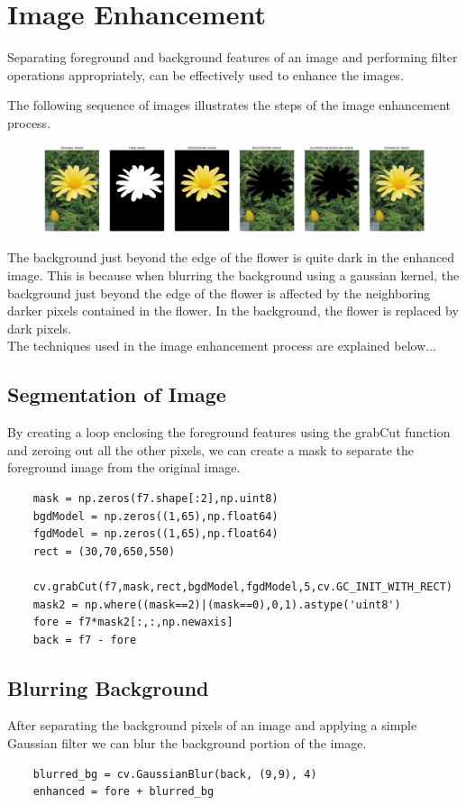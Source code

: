\documentclass[12pt,a4paper]{article}
\begin{document}
\section{Image Enhancement}
Separating foreground and background features of an image and performing filter operations appropriately, can be effectively used to enhance the images.
\par
The following sequence of images illustrates the steps of the image enhancement process. 
\par
\begin{figure}[h]
    \includegraphics[width=\textwidth]{q7.png}
    \centering
\end{figure}
The background just beyond the edge of the flower is quite dark in the enhanced image. This is because when blurring the background using a gaussian kernel, the background just beyond the edge of the flower is affected by the neighboring darker pixels contained in the flower.
In the background, the flower is replaced by dark pixels.
\\
The techniques used in the image enhancement process are explained below...
\newpage
\subsection{Segmentation of Image}
By creating a loop enclosing the foreground features using the grabCut function and zeroing out all the other pixels, we can create a mask to separate the foreground image from the original image.
\begin{lstlisting}
    mask = np.zeros(f7.shape[:2],np.uint8)
    bgdModel = np.zeros((1,65),np.float64)
    fgdModel = np.zeros((1,65),np.float64)
    rect = (30,70,650,550)
    
    cv.grabCut(f7,mask,rect,bgdModel,fgdModel,5,cv.GC_INIT_WITH_RECT)
    mask2 = np.where((mask==2)|(mask==0),0,1).astype('uint8')
    fore = f7*mask2[:,:,np.newaxis]
    back = f7 - fore
\end{lstlisting}
\subsection{Blurring Background}
After separating the background pixels of an image and applying a simple Gaussian filter we can blur the background portion of the image. 
\begin{lstlisting}
    blurred_bg = cv.GaussianBlur(back, (9,9), 4)
    enhanced = fore + blurred_bg
\end{lstlisting}
\vspace{5cm}
\end{document}
